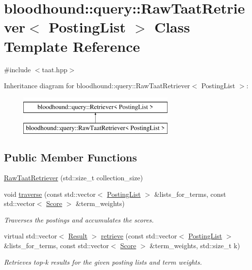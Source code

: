 \hypertarget{classbloodhound_1_1query_1_1RawTaatRetriever}{}\section{bloodhound\+:\+:query\+:\+:Raw\+Taat\+Retriever$<$ Posting\+List $>$ Class Template Reference}
\label{classbloodhound_1_1query_1_1RawTaatRetriever}


{\ttfamily \#include $<$taat.\+hpp$>$}

Inheritance diagram for bloodhound\+:\+:query\+:\+:Raw\+Taat\+Retriever$<$ Posting\+List $>$\+:\begin{figure}[H]
\begin{center}
\leavevmode
\includegraphics[height=2.000000cm]{classbloodhound_1_1query_1_1RawTaatRetriever}
\end{center}
\end{figure}
\subsection*{Public Member Functions}
\begin{DoxyCompactItemize}
\item 
\hyperlink{classbloodhound_1_1query_1_1RawTaatRetriever_a859b1cd2092da229964e2795c4445d72}{Raw\+Taat\+Retriever} (std\+::size\+\_\+t collection\+\_\+size)
\item 
void \hyperlink{classbloodhound_1_1query_1_1RawTaatRetriever_a70007a6dd5213e9c28266e38b424ba20}{traverse} (const std\+::vector$<$ \hyperlink{classbloodhound_1_1PostingList}{Posting\+List} $>$ \&lists\+\_\+for\+\_\+terms, const std\+::vector$<$ \hyperlink{structbloodhound_1_1Score}{Score} $>$ \&term\+\_\+weights)
\begin{DoxyCompactList}\small\item\em Traverses the postings and accumulates the scores. \end{DoxyCompactList}\item 
virtual std\+::vector$<$ \hyperlink{structbloodhound_1_1query_1_1Result}{Result} $>$ \hyperlink{classbloodhound_1_1query_1_1RawTaatRetriever_aafaaf842fdaef297a255e28766af2c0d}{retrieve} (const std\+::vector$<$ \hyperlink{classbloodhound_1_1PostingList}{Posting\+List} $>$ \&lists\+\_\+for\+\_\+terms, const std\+::vector$<$ \hyperlink{structbloodhound_1_1Score}{Score} $>$ \&term\+\_\+weights, std\+::size\+\_\+t k)
\begin{DoxyCompactList}\small\item\em Retrieves top-\/k results for the given posting lists and term weights. \end{DoxyCompactList}\end{DoxyCompactItemize}


